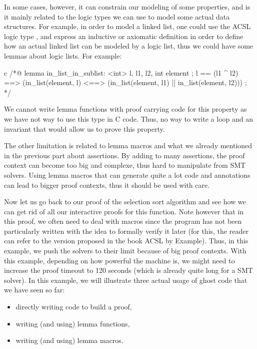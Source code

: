 In some cases, however, it can constrain our modeling of some properties, and
is it mainly related to the logic types we can use to model some actual data
structures. For example, in order to model a linked list, one could use the
ACSL logic type , and express an
inductive or axiomatic definition in order to define how an actual linked list
can be modeled by a logic list, thus we could have some lemmas about logic
lists. For example:

\begin{CodeBlock}{c}
/*@
  lemma in_list_in_sublist:
    \forall \list<int> l, l1, l2, int element ;
      l == (l1 ^ l2) ==>
      (in_list(element, l) <==> (in_list(element, l1) || in_list(element, l2))) ;
*/
\end{CodeBlock}

We cannot write lemma functions with proof carrying code for this property as
we have not way to use this type in C code. Thus, no way to write a loop and
an invariant that would allow us to prove this property.


The other limitation is related to lemma macros and what we already mentioned
in the previous part about assertions. By adding to many assertions, the proof
context can become too big and complexe, thus hard to manipulate from SMT
solvers. Using lemma macros that can generate quite a lot code and annotations
can lead to bigger proof contexts, thus it should be used with care.





Now let us go back to our proof of the selection sort algorithm and see how we
can get rid of all our interactive proofs for this function. Note however that
in this proof, we often need to deal with macros since the program has not been
particularly written with the idea to formally verify it later (for this, the
reader can refer to the version proposed in the book ACSL by Example). Thus, in
this example, we push the solvers to their limit because of big proof contexts.
With this example, depending on how powerful the machine is, we might need to
increase the proof timeout to 120 seconds (which is already quite long for a
SMT solver). In this example, we will illustrate three actual usage of ghost
code that we have seen so far:


\begin{itemize}
\item directly writing code to build a proof,
\item writing (and using) lemma functions,
\item writing (and using) lemma macros.
\end{itemize}


